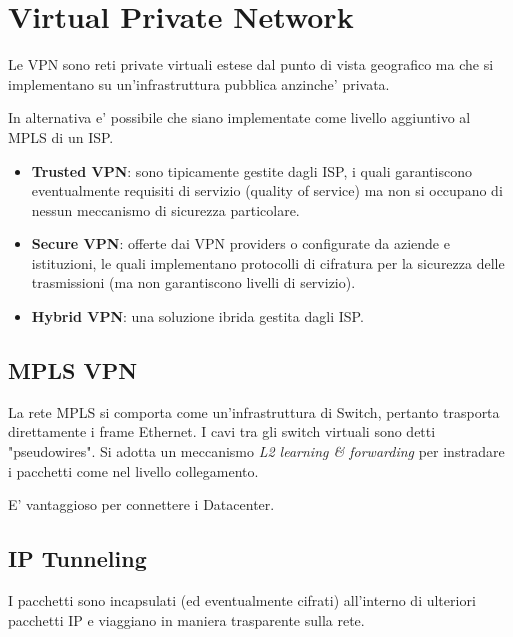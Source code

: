 \chapter{Virtual Private Network}

Le VPN sono reti private virtuali estese dal punto di vista geografico ma che si implementano su un'infrastruttura pubblica anzinche' privata.

In alternativa e' possibile che siano implementate come livello aggiuntivo al MPLS di un ISP.


\begin{itemize}
    \item \textbf{Trusted VPN}: sono tipicamente gestite dagli ISP, i quali garantiscono eventualmente requisiti di servizio (quality of service) ma non si occupano di nessun meccanismo di sicurezza particolare.
    \item \textbf{Secure VPN}: offerte dai VPN providers o configurate da aziende e istituzioni, le quali implementano protocolli di cifratura per la sicurezza delle trasmissioni (ma non garantiscono livelli di servizio).
    \item \textbf{Hybrid VPN}: una soluzione ibrida gestita dagli ISP.
\end{itemize}


\section{MPLS VPN}

La rete MPLS si comporta come un'infrastruttura di Switch, pertanto trasporta direttamente i frame Ethernet. I cavi tra gli switch virtuali sono detti "pseudowires". Si adotta un meccanismo \textit{L2 learning \& forwarding} per instradare i pacchetti come nel livello collegamento.

E' vantaggioso per connettere i Datacenter.


\section{IP Tunneling}

I pacchetti sono incapsulati (ed eventualmente cifrati) all'interno di ulteriori pacchetti IP e viaggiano in maniera trasparente sulla rete.

